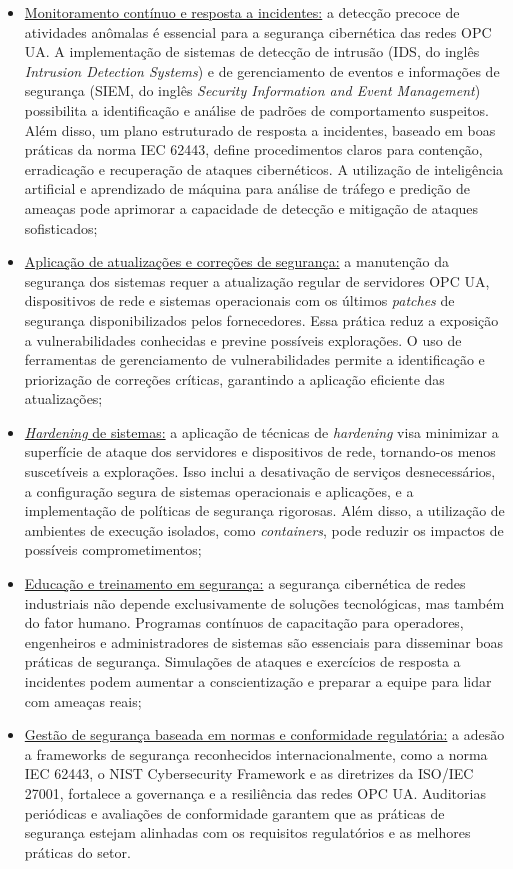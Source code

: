 \begin{itemize}
            \item \underline{Monitoramento contínuo e resposta a incidentes:} a detecção precoce de atividades anômalas é essencial para a segurança cibernética das redes OPC UA. A implementação de sistemas de detecção de intrusão (IDS, do inglês \textit{Intrusion Detection Systems}) e de gerenciamento de eventos e informações de segurança (SIEM, do inglês \textit{Security Information and Event Management}) possibilita a identificação e análise de padrões de comportamento suspeitos. Além disso, um plano estruturado de resposta a incidentes, baseado em boas práticas da norma IEC 62443, define procedimentos claros para contenção, erradicação e recuperação de ataques cibernéticos. A utilização de inteligência artificial e aprendizado de máquina para análise de tráfego e predição de ameaças pode aprimorar a capacidade de detecção e mitigação de ataques sofisticados;
            \item \underline{Aplicação de atualizações e correções de segurança:} a manutenção da segurança dos sistemas requer a atualização regular de servidores OPC UA, dispositivos de rede e sistemas operacionais com os últimos \textit{patches} de segurança disponibilizados pelos fornecedores. Essa prática reduz a exposição a vulnerabilidades conhecidas e previne possíveis explorações. O uso de ferramentas de gerenciamento de vulnerabilidades permite a identificação e priorização de correções críticas, garantindo a aplicação eficiente das atualizações;
            \item \underline{\textit{Hardening} de sistemas:} a aplicação de técnicas de \textit{hardening} visa minimizar a superfície de ataque dos servidores e dispositivos de rede, tornando-os menos suscetíveis a explorações. Isso inclui a desativação de serviços desnecessários, a configuração segura de sistemas operacionais e aplicações, e a implementação de políticas de segurança rigorosas. Além disso, a utilização de ambientes de execução isolados, como \textit{containers}, pode reduzir os impactos de possíveis comprometimentos;
            \item \underline{Educação e treinamento em segurança:} a segurança cibernética de redes industriais não depende exclusivamente de soluções tecnológicas, mas também do fator humano. Programas contínuos de capacitação para operadores, engenheiros e administradores de sistemas são essenciais para disseminar boas práticas de segurança. Simulações de ataques e exercícios de resposta a incidentes podem aumentar a conscientização e preparar a equipe para lidar com ameaças reais;
            \item \underline{Gestão de segurança baseada em normas e conformidade regulatória:} a adesão a frameworks de segurança reconhecidos internacionalmente, como a norma IEC 62443, o NIST Cybersecurity Framework e as diretrizes da ISO/IEC 27001, fortalece a governança e a resiliência das redes OPC UA. Auditorias periódicas e avaliações de conformidade garantem que as práticas de segurança estejam alinhadas com os requisitos regulatórios e as melhores práticas do setor.
        \end{itemize}
        

